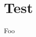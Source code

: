 \documentclass[11pt,a4paper]{article}
\title{\Huge{\articletitle}}
\author{
	Author Name \\
	\normalsize{Department} \\
	\normalsize{Organization}
}
\date{\normalsize{\todayiso}}
\begin{document}
\maketitle
\thispagestyle{empty}
\newpage




\setcounter{page}{1}
\section{Test}
Foo

%
%
%

%
%


%
\end{document}
